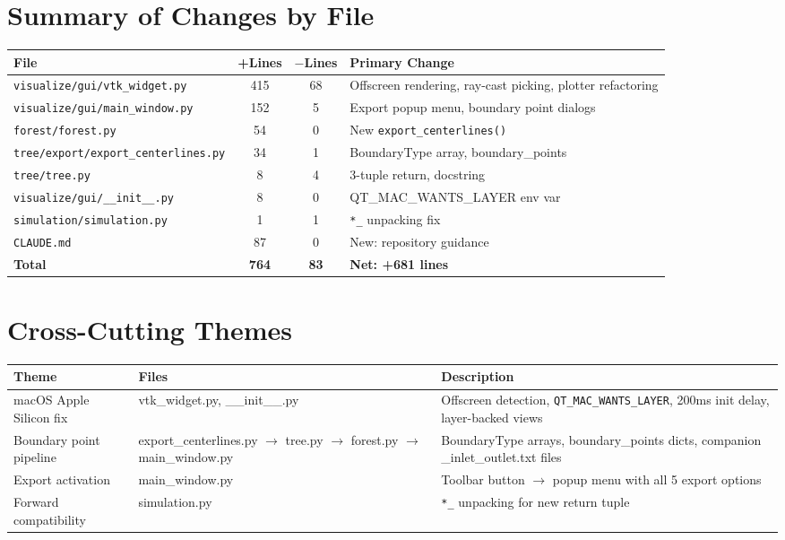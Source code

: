 \documentclass[11pt,a4paper]{article}
\begin{document}
\section{Summary of Changes by File}

\begin{longtable}{p{5cm}ccp{4.5cm}}
\toprule
\textbf{File} & \textbf{+Lines} & \textbf{$-$Lines} & \textbf{Primary Change} \\
\midrule
\endhead
\texttt{visualize/gui/vtk\_widget.py} & 415 & 68 & Offscreen rendering, ray-cast picking, plotter refactoring \\
\texttt{visualize/gui/main\_window.py} & 152 & 5 & Export popup menu, boundary point dialogs \\
\texttt{forest/forest.py} & 54 & 0 & New \texttt{export\_centerlines()} \\
\texttt{tree/export/export\_centerlines.py} & 34 & 1 & BoundaryType array, boundary\_points \\
\texttt{tree/tree.py} & 8 & 4 & 3-tuple return, docstring \\
\texttt{visualize/gui/\_\_init\_\_.py} & 8 & 0 & QT\_MAC\_WANTS\_LAYER env var \\
\texttt{simulation/simulation.py} & 1 & 1 & \texttt{*\_} unpacking fix \\
\texttt{CLAUDE.md} & 87 & 0 & New: repository guidance \\
\midrule
\textbf{Total} & \textbf{764} & \textbf{83} & \textbf{Net: +681 lines} \\
\bottomrule
\end{longtable}

\section{Cross-Cutting Themes}

\begin{longtable}{p{3.5cm}p{3.5cm}p{5cm}}
\toprule
\textbf{Theme} & \textbf{Files} & \textbf{Description} \\
\midrule
\endhead
macOS Apple Silicon fix & vtk\_widget.py, \_\_init\_\_.py & Offscreen detection, \texttt{QT\_MAC\_WANTS\_LAYER}, 200ms init delay, layer-backed views \\
\midrule
Boundary point pipeline & export\_centerlines.py $\to$ tree.py $\to$ forest.py $\to$ main\_window.py & BoundaryType arrays, boundary\_points dicts, companion \_inlet\_outlet.txt files \\
\midrule
Export activation & main\_window.py & Toolbar button $\to$ popup menu with all 5 export options \\
\midrule
Forward compatibility & simulation.py & \texttt{*\_} unpacking for new return tuple \\
\bottomrule
\end{longtable}
\end{document}
